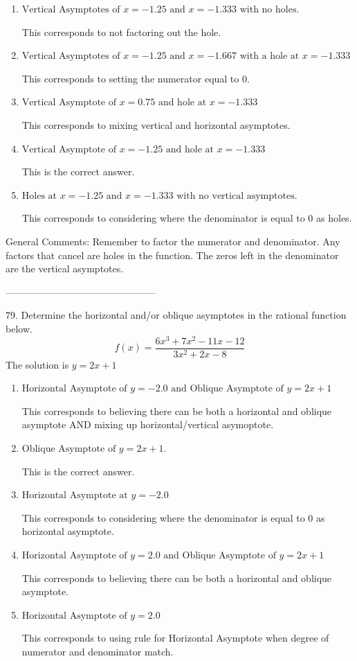 \documentclass{extbook}[14pt]
\begin{document}
\begin{enumerate}[label=\Alph*.] 
\item $ \text{Vertical Asymptotes of } x = -1.25 \text{ and } x = -1.333 \text{ with no holes.} $ 

 This corresponds to not factoring out the hole. 
\item $ \text{Vertical Asymptotes of } x = -1.25 \text{ and } x = -1.667 \text{ with a hole at } x = -1.333 $ 

 This corresponds to setting the numerator equal to 0. 
\item $ \text{Vertical Asymptote of } x = 0.75 \text{ and hole at } x = -1.333 $ 

 This corresponds to mixing vertical and horizontal asymptotes. 
\item $ \text{Vertical Asymptote of } x = -1.25 \text{ and hole at } x = -1.333 $ 

 This is the correct answer. 
\item $ \text{Holes at } x = -1.25 \text{ and } x = -1.333 \text{ with no vertical asymptotes.} $ 

 This corresponds to considering where the denominator is equal to 0 as holes. 
\end{enumerate} 
 
General Comments: Remember to factor the numerator and denominator. Any factors that cancel are holes in the function. The zeros left in the denominator are the vertical asymptotes.

-----------------------------------------------

79. Determine the horizontal and/or oblique asymptotes in the rational function below.
\[ f(x) = \frac{6x^{3} +7 x^{2} -11 x -12}{3x^{2} +2 x -8} \] 
The solution is $ y = 2x + 1 $ 

\begin{enumerate}[label=\Alph*.] 
\item $ \text{Horizontal Asymptote of } y = -2.0 \text{ and Oblique Asymptote of } y = 2x + 1 $ 

 This corresponds to believing there can be both a horizontal and oblique asymptote AND mixing up horizontal/vertical asymoptote. 
\item $ \text{Oblique Asymptote of } y = 2x + 1. $ 

 This is the correct answer. 
\item $ \text{Horizontal Asymptote at } y = -2.0 $ 

 This corresponds to considering where the denominator is equal to 0 as horizontal asymptote. 
\item $ \text{Horizontal Asymptote of } y = 2.0 \text{ and Oblique Asymptote of } y = 2x + 1 $ 

 This corresponds to believing there can be both a horizontal and oblique asymptote. 
\item $ \text{Horizontal Asymptote of } y = 2.0  $ 

 This corresponds to using rule for Horizontal Asymptote when degree of numerator and denominator match. 
\end{enumerate} 
 
\end{document}
